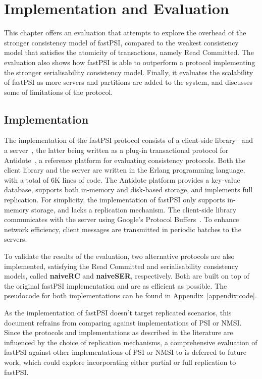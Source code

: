 \cleardoublepage
\chapter{Implementation and Evaluation}
\label{chapter:evaluation}

This chapter offers an evaluation that attempts to explore the overhead of the stronger consistency model of fastPSI, compared to the weakest consistency model that satisfies the atomicity of transactions, namely Read Committed. The evaluation also shows how fastPSI is able to outperform a protocol implementing the stronger serialisability consistency model. Finally, it evaluates the scalability of fastPSI as more servers and partitions are added to the system, and discusses some of limitations of the protocol.

\section{Implementation}

The implementation of the fastPSI protocol consists of a client-side library~\citep{fastPSIclient} and a server~\citep{pvc-server}, the latter being written as a plug-in transactional protocol for Antidote~\citep{antidote-db}, a reference platform for evaluating consistency protocols. Both the client library and the server are written in the Erlang programming language, with a total of 6K lines of code. The Antidote platform provides a key-value database, supports both in-memory and disk-based storage, and implements full replication. For simplicity, the implementation of fastPSI only supports in-memory storage, and lacks a replication mechanism. The client-side library communicates with the server using Google's Protocol Buffers~\citep{protobuf}. To enhance network efficiency, client messages are transmitted in periodic batches to the servers.

To validate the results of the evaluation, two alternative protocols are also implemented, satisfying the Read Committed and serialisability consistency models, called \textbf{naiveRC} and \textbf{naiveSER}, respectively. Both are built on top of the original fastPSI implementation and are as efficient as possible. The pseudocode for both implementations can be found in Appendix~\ref{appendix:code}.

As the implementation of fastPSI doesn't target replicated scenarios, this document refrains from comparing against implementations of PSI or NMSI. Since the protocols and implementations as described in the literature are influenced by the choice of replication mechanisms, a comprehensive evaluation of fastPSI against other implementations of PSI or NMSI to is deferred to future work, which could explore incorporating either partial or full replication to fastPSI.

